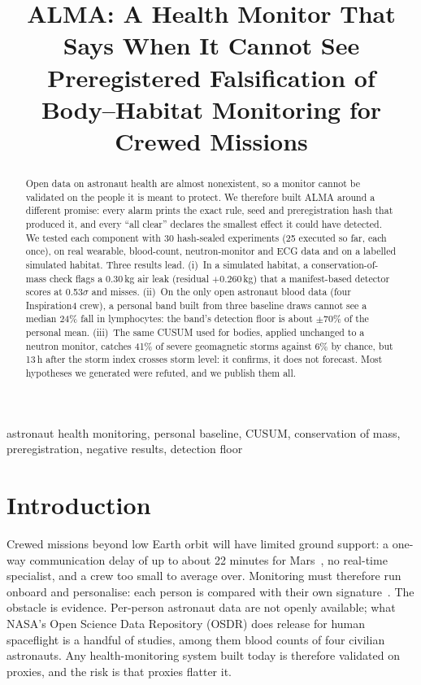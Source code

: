 \documentclass[conference]{IEEEtran}
\newcommand{\sd}{$\sigma$}
\begin{document}
\title{ALMA: A Health Monitor That Says When It Cannot See\\
\large Preregistered Falsification of Body--Habitat Monitoring for Crewed Missions}

\author{
}

\maketitle

\begin{abstract}
Open data on astronaut health are almost nonexistent, so a monitor cannot be validated on the people it is meant to protect. We therefore built ALMA around a different promise: every alarm prints the exact rule, seed and preregistration hash that produced it, and every ``all clear'' declares the smallest effect it could have detected. We tested each component with 30 hash-sealed experiments (25 executed so far, each once), on real wearable, blood-count, neutron-monitor and ECG data and on a labelled simulated habitat. Three results lead. (i)~In a simulated habitat, a conservation-of-mass check flags a 0.30\,kg air leak (residual $+0.260$\,kg) that a manifest-based detector scores at 0.53\sd{} and misses. (ii)~On the only open astronaut blood data (four Inspiration4 crew), a personal band built from three baseline draws cannot see a median 24\% fall in lymphocytes: the band's detection floor is about $\pm$70\% of the personal mean. (iii)~The same CUSUM used for bodies, applied unchanged to a neutron monitor, catches 41\% of severe geomagnetic storms against 6\% by chance, but 13\,h after the storm index crosses storm level: it confirms, it does not forecast. Most hypotheses we generated were refuted, and we publish them all.
\end{abstract}

\begin{IEEEkeywords}
astronaut health monitoring, personal baseline, CUSUM, conservation of mass, preregistration, negative results, detection floor
\end{IEEEkeywords}

\section{Introduction}
Crewed missions beyond low Earth orbit will have limited ground support: a one-way communication delay of up to about 22 minutes for Mars~\cite{mcbrayer2022}, no real-time specialist, and a crew too small to average over. Monitoring must therefore run onboard and personalise: each person is compared with their own signature~\cite{zheng2023,scott2023}. The obstacle is evidence. Per-person astronaut data are not openly available; what NASA's Open Science Data Repository (OSDR) does release for human spaceflight is a handful of studies, among them blood counts of four civilian astronauts. Any health-monitoring system built today is therefore validated on proxies, and the risk is that proxies flatter it.
\end{document}
